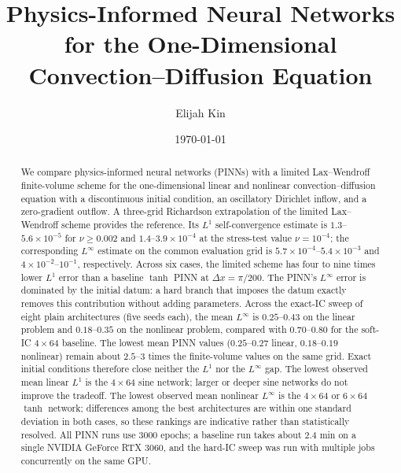 \documentclass[11pt]{article}
\title{Physics-Informed Neural Networks for the One-Dimensional\\
Convection--Diffusion Equation}
\author{Elijah Kin}
\date{\today}
\begin{document}
\maketitle

\begin{abstract}
  We compare physics-informed neural networks (PINNs) with a limited
  Lax--Wendroff finite-volume scheme for the one-dimensional linear and
  nonlinear convection--diffusion equation with a discontinuous initial
  condition, an oscillatory Dirichlet inflow, and a zero-gradient outflow. A
  three-grid Richardson extrapolation of the limited Lax--Wendroff scheme
  provides the reference. Its $L^1$ self-convergence estimate is
  $1.3$--$5.6\times10^{-5}$ for $\nu\ge0.002$ and
  $1.4$--$3.9\times10^{-4}$ at the stress-test value $\nu=10^{-4}$; the
  corresponding $L^\infty$ estimate on the common evaluation grid is
  $5.7\times10^{-4}$--$5.4\times10^{-3}$ and $4\times10^{-2}$--$10^{-1}$,
  respectively. Across six cases, the limited scheme has four to nine times
  lower $L^1$ error than a baseline $\tanh$ PINN at $\Delta x=\pi/200$. The
  PINN's $L^\infty$ error is dominated by the initial datum: a hard branch
  that imposes the datum exactly removes this contribution without adding
  parameters. Across the exact-IC sweep of eight plain architectures (five
  seeds each), the mean $L^\infty$ is $0.25$--$0.43$ on the linear problem and
  $0.18$--$0.35$ on the nonlinear problem, compared with $0.70$--$0.80$ for the
  soft-IC $4\times64$ baseline. The lowest mean PINN values ($0.25$--$0.27$
  linear, $0.18$--$0.19$ nonlinear) remain about $2.5$--$3$ times the
  finite-volume values on the same grid. Exact initial conditions therefore
  close neither the $L^1$ nor the $L^\infty$ gap. The lowest observed mean
  linear $L^1$ is the $4\times64$ sine network; larger or deeper sine networks
  do not improve the tradeoff. The lowest observed mean nonlinear $L^\infty$
  is the $4\times64$ or $6\times64$ $\tanh$ network; differences among the best
  architectures are within one standard deviation in both cases, so these
  rankings are indicative rather than statistically resolved. All PINN runs
  use 3000 epochs; a baseline run takes about $2.4$ min on a single NVIDIA
  GeForce RTX 3060, and the hard-IC sweep was run with multiple jobs
  concurrently on the same GPU.
\end{abstract}
\end{document}
